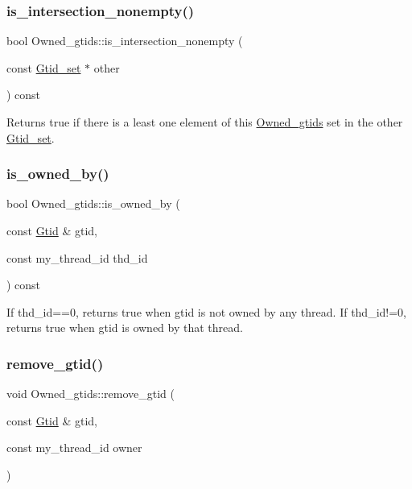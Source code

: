 \subsubsection{\texorpdfstring{is\+\_\+intersection\+\_\+nonempty()}{is\_intersection\_nonempty()}}
{\footnotesize\ttfamily bool Owned\+\_\+gtids\+::is\+\_\+intersection\+\_\+nonempty (\begin{DoxyParamCaption}\item[{const \mbox{\hyperlink{classGtid__set}{Gtid\+\_\+set}} $\ast$}]{other }\end{DoxyParamCaption}) const}

Returns true if there is a least one element of this \mbox{\hyperlink{classOwned__gtids}{Owned\+\_\+gtids}} set in the other \mbox{\hyperlink{classGtid__set}{Gtid\+\_\+set}}. \mbox{\label{classOwned__gtids_a5a377386748e0fbb46229e097388bf05}} 
\subsubsection{\texorpdfstring{is\+\_\+owned\+\_\+by()}{is\_owned\_by()}}
{\footnotesize\ttfamily bool Owned\+\_\+gtids\+::is\+\_\+owned\+\_\+by (\begin{DoxyParamCaption}\item[{const \mbox{\hyperlink{structGtid}{Gtid}} \&}]{gtid,  }\item[{const my\+\_\+thread\+\_\+id}]{thd\+\_\+id }\end{DoxyParamCaption}) const}

If thd\+\_\+id==0, returns true when gtid is not owned by any thread. If thd\+\_\+id!=0, returns true when gtid is owned by that thread. \mbox{\label{classOwned__gtids_afc63a8ed9cff1f2dddd102176535073d}} 
\subsubsection{\texorpdfstring{remove\+\_\+gtid()}{remove\_gtid()}}
{\footnotesize\ttfamily void Owned\+\_\+gtids\+::remove\+\_\+gtid (\begin{DoxyParamCaption}\item[{const \mbox{\hyperlink{structGtid}{Gtid}} \&}]{gtid,  }\item[{const my\+\_\+thread\+\_\+id}]{owner }\end{DoxyParamCaption})}


